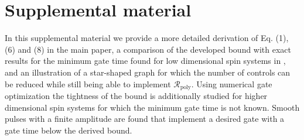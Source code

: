 \documentclass[aps,twocolumn,amsmath,amssymb,nofootinbib,superscriptaddress]{revtex4-1}
\begin{document}
\onecolumngrid
\section*{Supplemental material}
\label{ref:der}

In this supplemental material we provide a more detailed derivation of Eq. (1), (6) and (8) in the main paper, a comparison of the developed bound with exact results for the minimum gate time found for low dimensional spin systems in \cite{ExactCalc1,ExactCalc2}, and an illustration of a star-shaped graph for which the number of controls can be reduced while still being able to implement $\mathcal R_{\text{poly}}$. Using numerical gate optimization \cite{Grape, QuTip1, QuTip2} the tightness of the bound is additionally studied for higher dimensional spin systems for which the minimum gate time is not known. Smooth pulses with a finite amplitude are found that implement a desired gate with a gate time below the derived bound.    
\end{document}
